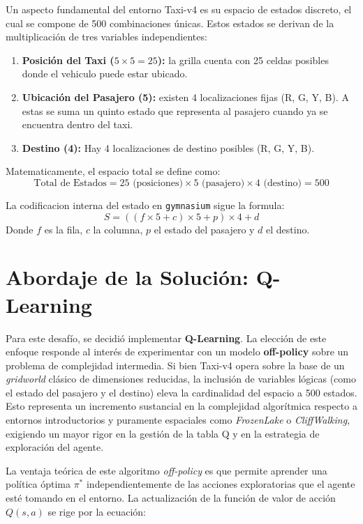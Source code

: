 \documentclass[11pt,a4paper]{article}
\begin{document}
Un aspecto fundamental del entorno Taxi-v4 es su espacio de estados discreto, el cual se compone de 500 combinaciones únicas. Estos estados se derivan de la multiplicación de tres variables independientes:

\begin{enumerate}
    \item \textbf{Posición del Taxi ($5 \times 5 = 25$):} la grilla cuenta con 25 celdas posibles donde el vehiculo puede estar ubicado.
    \item \textbf{Ubicación del Pasajero (5):} existen 4 localizaciones fijas (R, G, Y, B). A estas se suma un quinto estado que representa al pasajero cuando ya se encuentra dentro del taxi.
    \item \textbf{Destino (4):} Hay 4 localizaciones de destino posibles (R, G, Y, B).
\end{enumerate}

Matematicamente, el espacio total se define como:
\[ \text{Total de Estados} = 25 \text{ (posiciones)} \times 5 \text{ (pasajero)} \times 4 \text{ (destino)} = 500 \]

La codificacion interna del estado en \texttt{gymnasium} sigue la formula:
\[ S = ((f \times 5 + c) \times 5 + p) \times 4 + d \]
Donde $f$ es la fila, $c$ la columna, $p$ el estado del pasajero y $d$ el destino.

\section{Abordaje de la Solución: Q-Learning}

Para este desafío, se decidió implementar \textbf{Q-Learning}. La elección de este enfoque responde al interés de experimentar con un modelo \textbf{off-policy} sobre un problema de complejidad intermedia. 
Si bien Taxi-v4 opera sobre la base de un \textit{gridworld} clásico de dimensiones reducidas, la inclusión de variables lógicas (como el estado del pasajero y el destino) eleva la cardinalidad del espacio a 500 estados. Esto representa un incremento sustancial en la complejidad algorítmica respecto a entornos introductorios y puramente espaciales como \textit{FrozenLake} o \textit{CliffWalking}, exigiendo un mayor rigor en la gestión de la tabla Q y en la estrategia de exploración del agente.

La ventaja teórica de este algoritmo \textit{off-policy} es que permite aprender una política óptima $\pi^*$ independientemente de las acciones exploratorias que el agente esté tomando en el entorno. La actualización de la función de valor de acción $Q(s, a)$ se rige por la ecuación:
\end{document}
